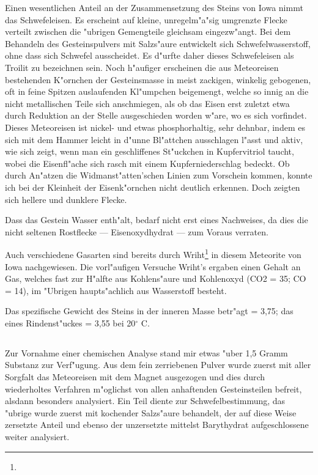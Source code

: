 \documentclass[a4paper, 11pt, oneside]{article}
\begin{document}
Einen wesentlichen Anteil an der Zusammensetzung des Steins von Iowa nimmt das Schwefeleisen. Es erscheint auf kleine, unregelm"a"sig umgrenzte Flecke verteilt zwischen die "ubrigen Gemengteile gleichsam eingezw"angt. Bei dem Behandeln des Gesteinspulvers mit Salzs"aure entwickelt sich Schwefelwasserstoff, ohne dass sich Schwefel ausscheidet. Es d"urfte daher dieses Schwefeleisen als Troilit zu bezeichnen sein. Noch h"aufiger erscheinen die aus Meteoreisen bestehenden K"ornchen der Gesteinsmasse in meist zackigen, winkelig gebogenen, oft in feine Spitzen auslaufenden Kl"umpchen beigemengt, welche so innig an die nicht metallischen Teile sich anschmiegen, als ob das Eisen erst zuletzt etwa durch Reduktion an der Stelle ausgeschieden worden w"are, wo es sich vorfindet. Dieses Meteoreisen ist nickel- und etwas phosphorhaltig, sehr dehnbar, indem es sich mit dem Hammer leicht in d"unne Bl"attchen ausschlagen l"asst und aktiv, wie sich zeigt, wenn man ein geschliffenes St"uckchen in Kupfervitriol taucht, wobei die Eisenfl"ache sich rasch mit einem Kupferniederschlag bedeckt. Ob durch An"atzen die Widmanst"atten’schen Linien zum Vorschein kommen, konnte ich bei der Kleinheit der Eisenk"ornchen nicht deutlich erkennen. Doch zeigten sich hellere und dunklere Flecke.

Dass das Gestein Wasser enth"alt, bedarf nicht erst eines Nachweises, da dies die nicht seltenen Rostflecke --- Eisenoxydhydrat --- zum Voraus verraten.

Auch verschiedene Gasarten sind bereits durch Wriht\footnote{} in diesem Meteorite von Iowa nachgewiesen. Die vorl"aufigen Versuche Wriht's ergaben einen Gehalt an Gas, welches fast zur H"alfte aus Kohlens"aure und Kohlenoxyd (CO2 = 35; CO = 14), im "Ubrigen haupts"achlich aus Wasserstoff besteht.

Das spezifische Gewicht des Steins in der inneren Masse betr"agt = 3,75; das eines Rindenst"uckes = 3,55 bei 20$^{\circ}$ C.
\clearpage
\subsection{}
\paragraph{}
Zur Vornahme einer chemischen Analyse stand mir etwas "uber 1,5 Gramm Substanz zur Verf"ugung. Aus dem fein zerriebenen Pulver wurde zuerst mit aller Sorgfalt das Meteoreisen mit dem Magnet ausgezogen und dies durch wiederholtes Verfahren m"oglichst von allen anhaftenden Gesteinsteilen befreit, alsdann besonders analysiert. Ein Teil diente zur Schwefelbestimmung, das "ubrige wurde zuerst mit kochender Salzs"aure behandelt, der auf diese Weise zersetzte Anteil und ebenso der unzersetzte mittelst Barythydrat aufgeschlossene weiter analysiert.
\end{document}
